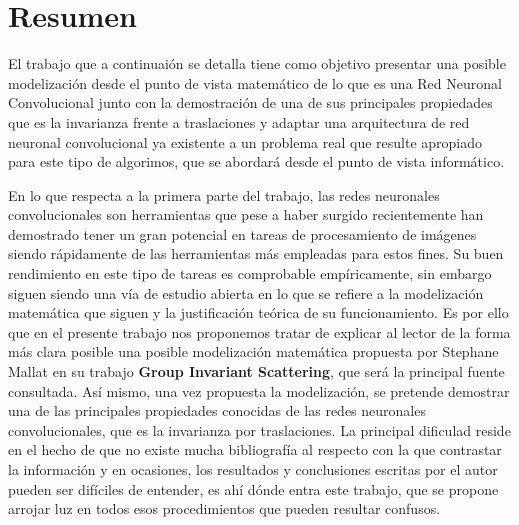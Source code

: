 %


\chapter{Resumen}

\noindent El trabajo que a continuaión se detalla tiene como objetivo presentar una posible modelización desde el punto de vista matemático de lo que es una Red Neuronal Convolucional junto con la demostración de una de sus principales propiedades que es la invarianza frente a traslaciones y adaptar una arquitectura de red neuronal convolucional ya existente a un problema real que resulte apropiado para este tipo de algorimos, que se abordará desde el punto de vista informático.

\medskip

\noindent En lo que respecta a la primera parte del trabajo, las redes neuronales convolucionales son herramientas que pese a haber surgido recientemente han demostrado tener un gran potencial en tareas de procesamiento de imágenes siendo rápidamente de las herramientas más empleadas para estos fines. Su buen rendimiento en este tipo de tareas es comprobable empíricamente, sin embargo siguen siendo una vía de estudio abierta en lo que se refiere a la modelización matemática que siguen y la justificación teórica de su funcionamiento. Es por ello que en el presente trabajo nos proponemos tratar de explicar al lector de la forma más clara posible una posible modelización matemática propuesta por Stephane Mallat en su trabajo \textbf{Group Invariant Scattering}, que será la principal fuente consultada. Así mismo, una vez propuesta la modelización, se pretende demostrar una de las principales propiedades conocidas de las redes neuronales convolucionales, que es la invarianza por traslaciones. La principal dificulad reside en el hecho de que no existe mucha bibliografía al respecto con la que contrastar la información y en ocasiones, los resultados y conclusiones escritas por el autor pueden ser difíciles de entender, es ahí dónde entra este trabajo, que se propone arrojar luz en todos esos procedimientos que pueden resultar confusos.

